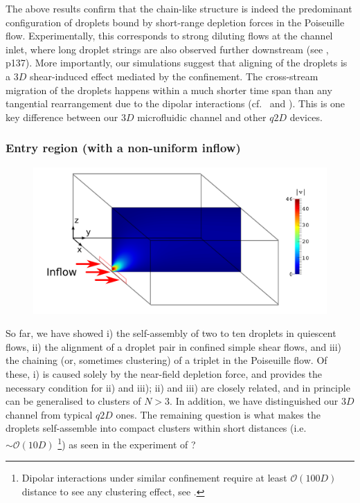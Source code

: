 The above results confirm that the chain-like structure is indeed the predominant configuration of droplets bound by short-range depletion forces in the Poiseuille flow. Experimentally, this corresponds to strong diluting flows at the channel inlet, where long droplet strings are also observed further downstream (see  \cite{shen_thesis}, p137). More importantly, our simulations suggest that aligning of the droplets is a $3D$ shear-induced effect mediated by the confinement. The cross-stream migration of the droplets happens within a much shorter time span than any tangential rearrangement due to the dipolar interactions (cf.\  \cite{Diamant} and  \cite{Fouxon_2017}). This is one key difference between our $3D$ microfluidic channel and other $q2D$ devices. 


\subsubsection{Entry region (with a non-uniform inflow)} \label{sec:non-uniform}

\begin{figure}[t]
 \centering
 \includegraphics[width=.9\columnwidth]{figs/non-uniform_inflow1.pdf}
 \caption{}
 \label{fig: non-uniform sketch}
\end{figure}

So far, we have showed i) the self-assembly of two to ten droplets in quiescent flows, ii) the alignment of a droplet pair in confined simple shear flows, and iii) the chaining (or, sometimes clustering) of a triplet in the Poiseuille flow. Of these, i) is caused solely by the near-field depletion force, and provides the necessary condition for ii) and iii); ii) and iii) are closely related, and in principle can be generalised to clusters of $N>3$. In addition, we have distinguished our $3D$ channel from typical $q2D$ ones. The remaining question is what makes the droplets self-assemble into compact clusters within short distances (i.e.\ $\sim \mathcal{O}(10D)$ \footnote[4]{Dipolar interactions under similar confinement require at least $\mathcal{O}(100D)$ distance to see any clustering effect, see \cite{Fouxon_2017}.}) as seen in the experiment of   \cite{Shen_2016AS}?

